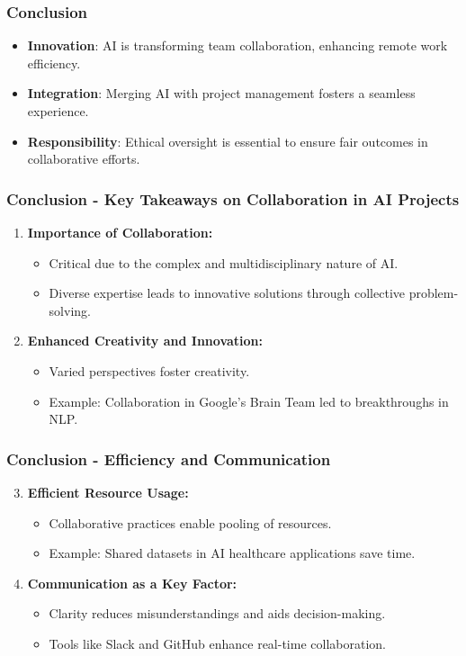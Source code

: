 \documentclass[aspectratio=169]{beamer}
\begin{document}
\begin{frame}[fragile]
    \frametitle{Conclusion}
    \begin{itemize}
        \item \textbf{Innovation}: AI is transforming team collaboration, enhancing remote work efficiency.
        \item \textbf{Integration}: Merging AI with project management fosters a seamless experience.
        \item \textbf{Responsibility}: Ethical oversight is essential to ensure fair outcomes in collaborative efforts.
    \end{itemize}
\end{frame}

\begin{frame}[fragile]
    \frametitle{Conclusion - Key Takeaways on Collaboration in AI Projects}
    \begin{enumerate}
        \item \textbf{Importance of Collaboration:}
            \begin{itemize}
                \item Critical due to the complex and multidisciplinary nature of AI.
                \item Diverse expertise leads to innovative solutions through collective problem-solving.
            \end{itemize}
        \item \textbf{Enhanced Creativity and Innovation:}
            \begin{itemize}
                \item Varied perspectives foster creativity.
                \item Example: Collaboration in Google’s Brain Team led to breakthroughs in NLP.
            \end{itemize}
    \end{enumerate}
\end{frame}

\begin{frame}[fragile]
    \frametitle{Conclusion - Efficiency and Communication}
    \begin{enumerate}
        \setcounter{enumi}{2}
        \item \textbf{Efficient Resource Usage:}
            \begin{itemize}
                \item Collaborative practices enable pooling of resources.
                \item Example: Shared datasets in AI healthcare applications save time.
            \end{itemize}
        \item \textbf{Communication as a Key Factor:}
            \begin{itemize}
                \item Clarity reduces misunderstandings and aids decision-making.
                \item Tools like Slack and GitHub enhance real-time collaboration.
            \end{itemize}
    \end{enumerate}
\end{frame}
\end{document}
